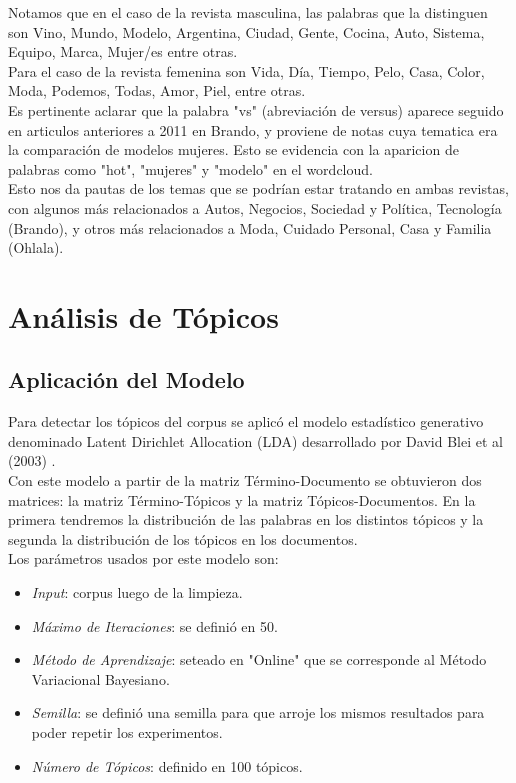 \documentclass[a4paper]{article}
\begin{document}
Notamos que en el caso de la revista masculina, las palabras que la distinguen son Vino, Mundo, Modelo, Argentina, Ciudad, Gente, Cocina, Auto, Sistema, Equipo, Marca, Mujer/es entre otras.\\
Para el caso de la revista femenina son Vida, D\'ia, Tiempo, Pelo, Casa, Color, Moda, Podemos, Todas, Amor, Piel, entre otras.\\
Es pertinente aclarar que la palabra "vs" (abreviaci\'on de versus) aparece seguido en articulos anteriores a 2011 en Brando, y proviene de notas cuya tematica era la comparaci\'on de modelos mujeres. Esto se evidencia con la aparicion de palabras como "hot", "mujeres" y "modelo" en el wordcloud.\\
Esto nos da pautas de los temas que se podr\'ian estar tratando en ambas revistas, con algunos m\'as relacionados a Autos, Negocios, Sociedad y Pol\'itica, Tecnolog\'ia (Brando), y otros m\'as relacionados a Moda, Cuidado Personal, Casa y Familia (Ohlala).


\section{An\'alisis de T\'opicos}

\subsection{Aplicaci\'on del Modelo}
Para detectar los t\'opicos del corpus se aplic\'o el modelo estad\'istico generativo denominado Latent Dirichlet Allocation (LDA) desarrollado por David Blei et al (2003) \cite{LDA}.\\
Con este modelo a partir de la matriz T\'ermino-Documento se obtuvieron dos matrices: la matriz T\'ermino-T\'opicos y la matriz T\'opicos-Documentos. En la primera tendremos la distribuci\'on de las palabras en los distintos t\'opicos y la segunda la distribuci\'on de los t\'opicos en los documentos.\\
Los par\'ametros usados por este modelo son:
\begin{itemize}
\item \textit{Input}: corpus luego de la limpieza.
\item \textit{M\'aximo de Iteraciones}: se defini\'o en 50.
\item \textit{M\'etodo de Aprendizaje}: seteado en "Online" que se corresponde al M\'etodo Variacional Bayesiano.
\item \textit{Semilla}: se defini\'o una semilla para que arroje los mismos resultados para poder repetir los experimentos.
\item \textit{N\'umero de T\'opicos}: definido en 100 t\'opicos.
\end{itemize}
\end{document}

